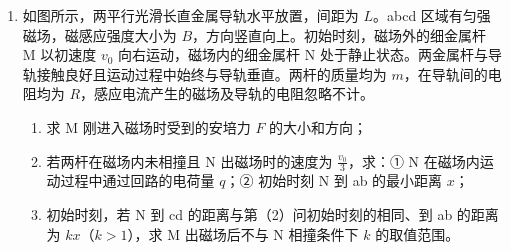 \documentclass[\gkver]{gaokaozhenti}
\begin{document}
\begin{enumerate}
{$-mgR + qE \cdot \sqrt{2}R = \frac{1}{2}mv_{O}^{2} - \frac{1}{2}mv_{B}^{2}$

解得 $v_{O} = \sqrt{3gR}$

（3）小球运动至 O 点时速度竖直向上，受电场力和重力作用，将电场力分解到 x 轴和 y 轴，则 x 轴方向有

$qE\cos45^{\circ}=ma_{x}$

竖直方向有

$qE\sin45^{\circ}-mg=ma_{y}$

解得 $a_{x}=g,\quad a_{y}=0$

说明小球从 O 点开始以后的运动为 x 轴方向做初速度为零的匀加速直线运动，y 轴方向做匀速直线运动，即做类平抛运动，则有

$x=\frac{1}{2}gt^{2},\quad y=v_{O}t$

联立解得小球过 O 点后运动的轨迹方程 $y^{2}=6Rx$
}

\item
如图所示，两平行光滑长直金属导轨水平放置，间距为 $L$。abcd 区域有匀强磁场，磁感应强度大小为 $B$，方向竖直向上。初始时刻，磁场外的细金属杆 M 以初速度 $v_{0}$ 向右运动，磁场内的细金属杆 N 处于静止状态。两金属杆与导轨接触良好且运动过程中始终与导轨垂直。两杆的质量均为 $m$，在导轨间的电阻均为 $R$，感应电流产生的磁场及导轨的电阻忽略不计。

\begin{enumerate}
	\item
	求 M 刚进入磁场时受到的安培力 $F$ 的大小和方向；
	\item
	若两杆在磁场内未相撞且 N 出磁场时的速度为 $\frac{v_{0}}{3}$，求：① N 在磁场内运动过程中通过回路的电荷量 $q$；② 初始时刻 N 到 ab 的最小距离 $x$；
	\item
	初始时刻，若 N 到 cd 的距离与第（2）问初始时刻的相同、到 ab 的距离为 $kx$（$k > 1$），求 M 出磁场后不与 N 相撞条件下 $k$ 的取值范围。
\end{enumerate}

\onepicture[w=8.20cm, align=right]{}

\end{enumerate}
\end{document}
